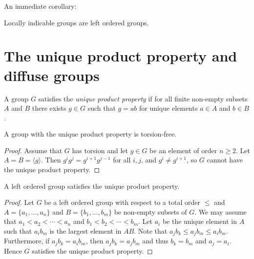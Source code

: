 An immediate corollary:

\begin{corollary}\label{cor:LIimpliesLO}
	Locally indicable groups are left ordered groups. 
\end{corollary}

%

\section{The unique product property and diffuse groups}

A group $G$ satisfies the {\em unique product property} if for all finite non-empty subsets
$A$ and $B$ there exists $g\in G$ such that $g=ab$ for unique elements 
$a\in A$ and $b\in B$.  

\begin{proposition}
	A group with the unique product property is torsion-free.	
\end{proposition}

\begin{proof}
	Assume that $G$ has torsion and let $g\in G$ be an element of order $n\geq2$. 
	Let $A=B=\langle g\rangle$. Then $g^{i}g^{j}=g^{i+1}g^{j-1}$ for all $i,j$, and $g^{i}\neq g^{i+1}$, so $G$ cannot have the unique product property. 
\end{proof}

\begin{proposition}
	A left ordered group satisfies the unique product property.
\end{proposition}

\begin{proof}
	Let $G$ be a left ordered group with respect to a total order $\leq$ and 
    $A=\{a_1,\dots,a_n\}$ and $B=\{b_1,\dots,b_m\}$ be non-empty 
    subsets of $G$. We may assume that $a_1<a_2<\cdots<a_n$ and
    $b_1<b_2<\cdots<b_m$. Let $a_i$ be the unique element in $A$ such that $a_ib_m$ is the largest element in $AB$. Note that $a_jb_k\leq a_jb_m\leq a_ib_m$. Furthermore, if $a_jb_k=a_ib_m$, then $a_jb_k=a_jb_m$ and thus $b_k=b_m$ and $a_j=a_i$. Hence $G$ satisfies the unique product property.
\end{proof}

